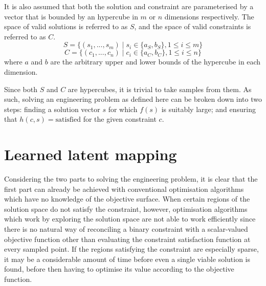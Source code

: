 \documentclass[../../main.tex]{subfiles}
\begin{document}
It is also assumed that both the solution and constraint are parameterised by a vector that is bounded by an hypercube in $m$ or $n$ dimensions respectively.
The space of valid solutions is referred to as $S$, and the space of valid constraints is referred to as $C$.
\begin{equation}
    S=\{(s_1,...,s_m)\;|\;s_i\in\{a_S,b_S\},1\le i\le m\}
\end{equation}
\begin{equation}
    C=\{(c_1,...,c_n)\;|\;c_i\in\{a_C,b_C\},1\le i\le n\}
\end{equation}
where $a$ and $b$ are the arbitrary upper and lower bounds of the hypercube in each dimension.

Since both $S$ and $C$ are hypercubes, it is trivial to take samples from them.
As such, solving an engineering problem as defined here can be broken down into two steps: finding a solution vector $s$ for which $f(s)$ is suitably large; and ensuring that $h(c,s)=\text{satisfied}$ for the given constraint $c$.

\section{Learned latent mapping} \label{section:learnedLatentMapping}

Considering the two parts to solving the engineering problem, it is clear that the first part can already be achieved with conventional optimisation algorithms which have no knowledge of the objective surface.
When certain regions of the solution space do not satisfy the constraint, however, optimisation algorithms which work by exploring the solution space are not able to work efficiently since there is no natural way of reconciling a binary constraint with a scalar-valued objective function other than evaluating the constraint satisfaction function at every sampled point.
If the regions satisfying the constraint are especially sparse, it may be a considerable amount of time before even a single viable solution is found, before then having to optimise its value according to the objective function.
\end{document}
